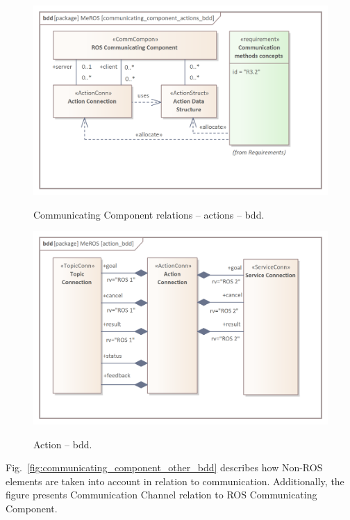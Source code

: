 \documentclass{ieeeaccess}
\begin{document}
	\begin{figure}[htb]
		\centering
		\begin{center}
			{\includegraphics[scale=0.68]{img/meros_pkg/communicating_component_actions_bdd.png}}
		\end{center}
		\caption{Communicating Component relations -- actions -- bdd.} 
		\label{fig:communicating_component_actions_bdd}
	\end{figure}
	\begin{figure}[hbt]
		\centering
		\begin{center}
			{\includegraphics[scale=0.68]{img/meros_pkg/action_bdd.png}}
		\end{center}
		\caption{Action -- bdd.} 
		\label{fig:action_bdd}
	\end{figure}
	
	Fig.~\ref{fig:communicating_component_other_bdd} describes how Non-ROS elements are taken into account in relation to communication. Additionally, the figure presents Communication Channel relation to ROS Communicating Component.
	
\end{document}
